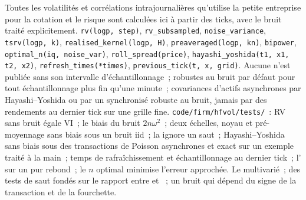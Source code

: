 \begin{build}
 Toutes les volatilités et corrélations intrajournalières qu'utilise la petite entreprise pour la cotation et le risque sont calculées ici à partir des ticks, avec le bruit traité explicitement.
 \texttt{rv(logp, step)}, \texttt{rv\_subsampled}, \texttt{noise\_variance}, \texttt{tsrv(logp, k)}, \texttt{realised\_kernel(logp, H)},
\texttt{preaveraged(logp, kn)}, \texttt{bipower}, \texttt{optimal\_n(iq, noise\_var)}, \texttt{roll\_spread(price)}, \texttt{hayashi\_yoshida(t1, x1, t2, x2)},
\texttt{refresh\_times(*times)}, \texttt{previous\_tick(t, x, grid)}.
 Aucune  n'est publiée sans son intervalle d'échantillonnage~;  robustes au bruit par défaut pour tout échantillonnage plus fin qu'une minute~; covariances d'actifs
asynchrones par Hayashi--Yoshida ou par un  synchronisé robuste au bruit, jamais par des rendements au dernier tick sur une grille fine.
 \texttt{code/firm/hfvol/tests/}~: RV sans bruit égale VI~; le biais du bruit $2n\omega^2$~; deux échelles, noyau et pré-moyennage sans biais sous un bruit iid~;
la  ignore un saut~; Hayashi--Yoshida sans biais sous des transactions de Poisson asynchrones et exact sur un exemple traité à la main~; temps de rafraîchissement et échantillonnage au dernier tick~;
l' sur un pur rebond~; le $n$ optimal minimise l'erreur approchée.
 Le  multivarié~; des tests de saut fondés sur le rapport entre  et ~; un bruit qui dépend du signe de la transaction et de la fourchette.
\end{build}

